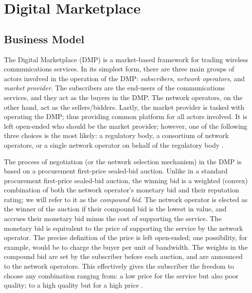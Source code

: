 \chapter{Digital Marketplace} %
\label{cha:dmp}

\section{Business Model} %
\label{sec:business_model_dmp}
The Digital Marketplace (DMP) is a market-based framework for trading wireless communications services. In its simplest form, there are three main groups of actors involved in the operation of the DMP: \emph{subscribers}, \emph{network operators}, and \emph{market provider}. The subscribers are the end-users of the communications services, and they act as the buyers in the DMP. The network operators, on the other hand, act as the sellers/bidders. Lastly, the market provider is tasked with operating the DMP; thus providing common platform for all actors involved. It is left open-ended who should be the market provider; however, one of the following three choices is the most likely: a regulatory body, a consortium of network operators, or a single network operator on behalf of the regulatory body \cite{DMIrvine02}.

The process of negotiation (or the network selection mechanism) in the DMP is based on a procurement first-price sealed-bid auction. Unlike in a standard procurement first-price sealed-bid auction, the winning bid is a weighted (convex) combination of both the network operator's monetary bid and their reputation rating; we will refer to it as the \emph{compound bid}. The network operator is elected as the winner of the auction if their compound bid is the lowest in value, and accrues their monetary bid minus the cost of supporting the service. The monetary bid is equivalent to the price of supporting the service by the network operator. The precise definition of the price is left open-ended; one possibility, for example, would be to charge the buyer per unit of bandwidth. The weights in the compound bid are set by the subscriber before each auction, and are announced to the network operators. This effectively gives the subscriber the freedom to choose any combination ranging from: a low price for the service but also poor quality; to a high quality but for a high price \cite{DMLeBodic00}.

